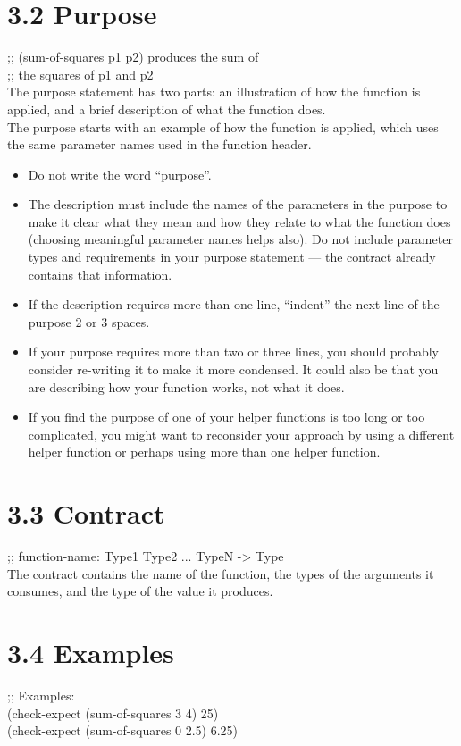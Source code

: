\documentclass{article}     %
\begin{document}
\section*{3.2 Purpose}
;; (sum-of-squares p1 p2) produces the sum of\\
;; the squares of p1 and p2\\
The purpose statement has two parts: an illustration of how the function is applied, and a brief description of what the function does. \\
The purpose starts with an example of how the function is applied, which
uses the same parameter names used in the function header.
\begin{itemize} 
\item Do not write the word “purpose”.
\item The description must include the names of the parameters in the purpose
to make it clear what they mean and how they relate to what the function
does (choosing meaningful parameter names helps also). Do not include
parameter types and requirements in your purpose statement — the contract
already contains that information.
\item If the description requires more than one line, “indent” the next line of the
purpose 2 or 3 spaces.
\item If your purpose requires more than two or three lines, you should probably
consider re-writing it to make it more condensed. It could also be that you
are describing how your function works, not what it does.
\item If you find the purpose of one of your helper functions is too long or too
complicated, you might want to reconsider your approach by using a different
helper function or perhaps using more than one helper function.
\end{itemize}

\section*{3.3 Contract}
;; function-name: Type1 Type2 ... TypeN -> Type\\
The contract contains the name of the function, the types of the arguments it consumes,
and the type of the value it produces.

\section*{3.4 Examples}
;; Examples:\\
(check-expect (sum-of-squares 3 4) 25)\\
(check-expect (sum-of-squares 0 2.5) 6.25)
\end{document}
